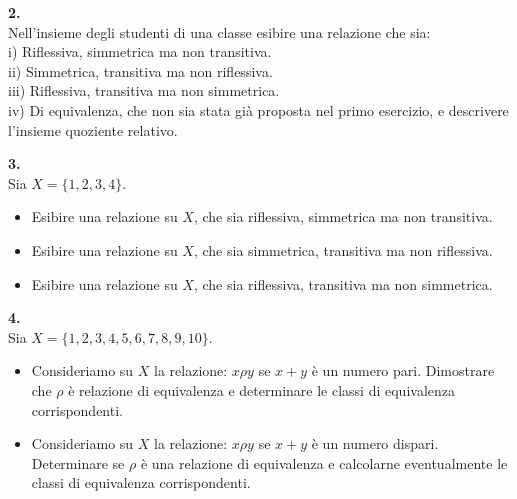 \documentclass[italian,a4paper,11pt]
{article}
\begin{document}
\vspace{0.4cm}
\noindent
\begin{Ex}\textbf{ 2.}\\
Nell'insieme degli studenti di una classe esibire una relazione che sia:\\
i) Riflessiva, simmetrica ma non transitiva.\\
ii) Simmetrica, transitiva ma non riflessiva.\\
iii) Riflessiva, transitiva ma non simmetrica.\\
iv) Di equivalenza, che non sia stata gi\`a proposta nel primo esercizio, e descrivere l'insieme quoziente relativo.
\end{Ex}

\vspace{0.4cm}
\noindent
\begin{Ex}\textbf{ 3.}\\
Sia $X = \{1, 2, 3, 4\}$.
\begin{itemize}
	\item Esibire una relazione su $X$, che sia riflessiva, simmetrica ma non transitiva.
	\item Esibire una relazione su $X$, che sia simmetrica, transitiva ma non riflessiva.
	\item Esibire una relazione su $X$, che sia riflessiva, transitiva ma non simmetrica.
\end{itemize}
\end{Ex}


\vspace{0.4cm}
\noindent
\begin{Ex}\textbf{ 4.}\\
Sia $X = \{1, 2, 3, 4, 5, 6, 7, 8, 9, 10\}$.
\begin{itemize}
	\item Consideriamo su $X$ la relazione: $x \rho y$ se $x+y$ \`e un numero pari. Dimostrare che $\rho$ \`e relazione di equivalenza e determinare le classi di equivalenza corrispondenti.
	\item Consideriamo su $X$ la relazione: $x \rho y$ se $x+y$ \`e un numero dispari. Determinare se $\rho$ \`e una relazione di equivalenza e calcolarne eventualmente le classi di equivalenza corrispondenti.
\end{itemize}
\end{Ex}
\end{document}
